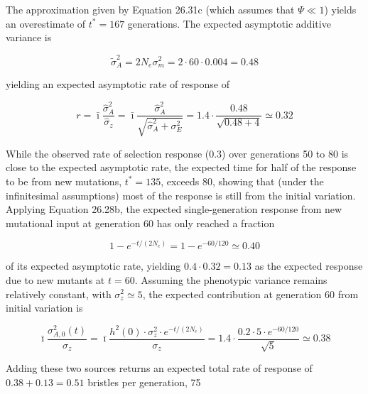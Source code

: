 \documentclass{article}
\begin{document}
{The approximation given by Equation 26.31c (which assumes that  $ \Psi \ll 1 $) yields an overestimate of  $ t^* = 167 $ generations. The expected asymptotic additive variance is

\begin{equation}
\widetilde{\sigma}_{A}^{2}=2N_{e}\sigma_{m}^{2}=2\cdot60\cdot0.004=0.48
\end{equation}

yielding an expected asymptotic rate of response of

\begin{equation}
r=\bar{\imath}\frac{\widehat{\sigma}_{A}^{2}}{\widehat{\sigma}_{z}}=\bar{\imath}\frac{\widehat{\sigma}_{A}^{2}}{\sqrt{\widehat{\sigma}_{A}^{2}+\sigma_{E}^{2}}}=1.4\cdot\frac{0.48}{\sqrt{0.48+4}}\simeq0.32
\end{equation}

While the observed rate of selection response (0.3) over generations 50 to 80 is close to the expected asymptotic rate, the expected time for half of the response to be from new mutations,  $ t^* = 135 $, exceeds 80, showing that (under the infinitesimal assumptions) most of the response is still from the initial variation. Applying Equation 26.28b, the expected single-generation response from new mutational input at generation 60 has only reached a fraction

\begin{equation}
1-e^{-t/(2N_{e})}=1-e^{-60/120}\simeq0.40
\end{equation}

of its expected asymptotic rate, yielding  $ 0.4 \cdot 0.32 = 0.13 $ as the expected response due to new mutants at  $ t = 60 $. Assuming the phenotypic variance remains relatively constant, with  $ \sigma_z^2 \simeq 5 $, the expected contribution at generation 60 from initial variation is

\begin{equation}
\bar{\imath}\frac{\sigma_{A,0}^{2}(t)}{\sigma_{z}}=\bar{\imath}\frac{h^{2}(0)\cdot\sigma_{z}^{2}\cdot e^{-t/(2N_{e})}}{\sigma_{z}}=1.4\cdot\frac{0.2\cdot5\cdot e^{-60/120}}{\sqrt{5}}\simeq0.38
\end{equation}

Adding these two sources returns an expected total rate of response of  $ 0.38 + 0.13 = 0.51 $ bristles per generation, 75%

}
\end{document}
